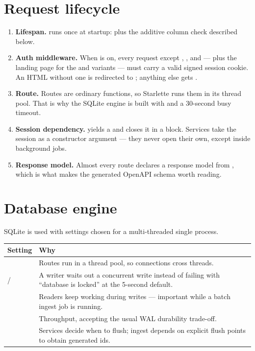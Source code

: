 \section{Request lifecycle}

\begin{enumerate}
\item \textbf{Lifespan.}  runs once at startup:
 plus the additive column check described below.

\item \textbf{Auth middleware.} When  is on, every
request except , ,  and
 --- plus the landing page for the  and
 variants --- must carry a valid signed session cookie. An HTML
 without one is redirected to ; anything else gets
.

\item \textbf{Route.} Routes are ordinary  functions, so Starlette runs
them in its thread pool. That is why the SQLite engine is built with
 and a 30-second busy timeout.

\item \textbf{Session dependency.}  yields a
 and closes it in a  block. Services take the
session as a constructor argument --- they never open their own, except inside
background jobs.

\item \textbf{Response model.} Almost every route declares a response model from
, which is what makes the generated OpenAPI schema
worth reading.
\end{enumerate}

\section{Database engine}

SQLite is used with settings chosen for a multi-threaded single process.

\begin{longtable}{L{0.32\textwidth} L{0.58\textwidth}}
\toprule
\textbf{Setting} & \textbf{Why} \\
\midrule
\endfirsthead
\bottomrule
\endfoot
{} & Routes run in a thread pool, so connections
cross threads. \\
 /  & A writer waits out a
concurrent write instead of failing with ``database is locked'' at the 5-second
default. \\
 & Readers keep working during writes ---
important while a batch ingest job is running. \\
 & Throughput, accepting the usual WAL
durability trade-off. \\
 & Services decide when to flush; ingest depends on
explicit flush points to obtain generated ids. \\
\end{longtable}


